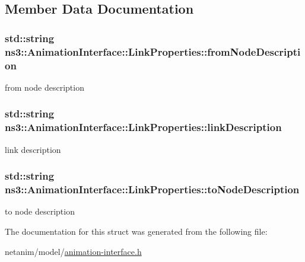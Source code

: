 \subsection{Member Data Documentation}
\subsubsection[{\texorpdfstring{from\+Node\+Description}{fromNodeDescription}}]{\setlength{\rightskip}{0pt plus 5cm}std\+::string ns3\+::\+Animation\+Interface\+::\+Link\+Properties\+::from\+Node\+Description}\hypertarget{structns3_1_1AnimationInterface_1_1LinkProperties_a49194de50053ac5773bfef5d4dc95f9f}{}\label{structns3_1_1AnimationInterface_1_1LinkProperties_a49194de50053ac5773bfef5d4dc95f9f}


from node description 

\subsubsection[{\texorpdfstring{link\+Description}{linkDescription}}]{\setlength{\rightskip}{0pt plus 5cm}std\+::string ns3\+::\+Animation\+Interface\+::\+Link\+Properties\+::link\+Description}\hypertarget{structns3_1_1AnimationInterface_1_1LinkProperties_aaf9b6d3ed0f26c0ba8569709adf9a5fe}{}\label{structns3_1_1AnimationInterface_1_1LinkProperties_aaf9b6d3ed0f26c0ba8569709adf9a5fe}


link description 

\subsubsection[{\texorpdfstring{to\+Node\+Description}{toNodeDescription}}]{\setlength{\rightskip}{0pt plus 5cm}std\+::string ns3\+::\+Animation\+Interface\+::\+Link\+Properties\+::to\+Node\+Description}\hypertarget{structns3_1_1AnimationInterface_1_1LinkProperties_ace49969429486a625724ec0dcd345c38}{}\label{structns3_1_1AnimationInterface_1_1LinkProperties_ace49969429486a625724ec0dcd345c38}


to node description 



The documentation for this struct was generated from the following file\+:\begin{DoxyCompactItemize}
\item 
netanim/model/\hyperlink{animation-interface_8h}{animation-\/interface.\+h}\end{DoxyCompactItemize}
